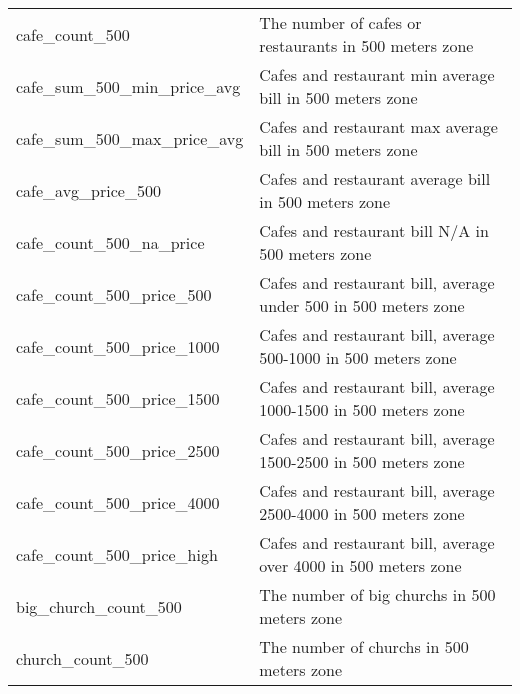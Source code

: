 \begin{longtable}[c]{ll}
    cafe\_count\_500                           & The number of cafes or restaurants in 500 meters zone                                                                     \\
    cafe\_sum\_500\_min\_price\_avg            & Cafes and restaurant min average bill in 500 meters zone                                                                  \\
    cafe\_sum\_500\_max\_price\_avg            & Cafes and restaurant max average bill in 500 meters zone                                                                  \\
    cafe\_avg\_price\_500                      & Cafes and restaurant average bill in 500 meters zone                                                                      \\
    cafe\_count\_500\_na\_price                & Cafes and restaurant bill N/A in 500 meters zone                                                                          \\
    cafe\_count\_500\_price\_500               & Cafes and restaurant bill, average under 500 in 500 meters zone                                                           \\
    cafe\_count\_500\_price\_1000              & Cafes and restaurant bill, average  500-1000 in 500 meters zone                                                           \\
    cafe\_count\_500\_price\_1500              & Cafes and restaurant bill, average  1000-1500 in 500 meters zone                                                          \\
    cafe\_count\_500\_price\_2500              & Cafes and restaurant bill, average  1500-2500 in 500 meters zone                                                          \\
    cafe\_count\_500\_price\_4000              & Cafes and restaurant bill, average  2500-4000 in 500 meters zone                                                          \\
    cafe\_count\_500\_price\_high              & Cafes and restaurant bill, average  over 4000 in 500 meters zone                                                          \\
    big\_church\_count\_500                    & The number of big churchs in 500 meters zone                                                                              \\
    church\_count\_500                         & The number of churchs in 500 meters zone                                                                                  \\

\end{longtable}
